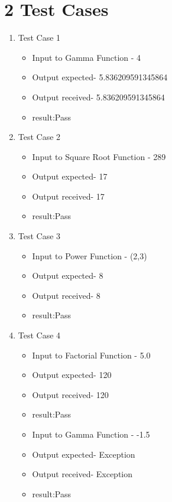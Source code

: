 \documentclass{report}
\begin{document}
\section*{2 Test Cases}
\begin{enumerate}
\item Test Case 1
\begin{itemize}
    \item Input to Gamma Function - 4
    \item Output expected- 5.836209591345864
    \item Output received- 5.836209591345864
    \item result:Pass
\end{itemize}

\item Test Case 2
\begin{itemize}
    \item Input to Square Root Function - 289
    \item Output expected- 17
    \item Output received- 17
    \item result:Pass
\end{itemize}

\item Test Case 3
\begin{itemize}
    \item Input to Power Function - (2,3)
    \item Output expected- 8
    \item Output received- 8
    \item result:Pass
\end{itemize}

\item Test Case 4
\begin{itemize}
    \item Input to Factorial Function - 5.0
    \item Output expected- 120
    \item Output received- 120
    \item result:Pass
\end{itemize}

\begin{itemize} Test case 5
    \item Input to Gamma Function - -1.5
    \item Output expected- Exception
    \item Output received- Exception
    \item result:Pass
\end{itemize}
\end{enumerate}
\end{document}
